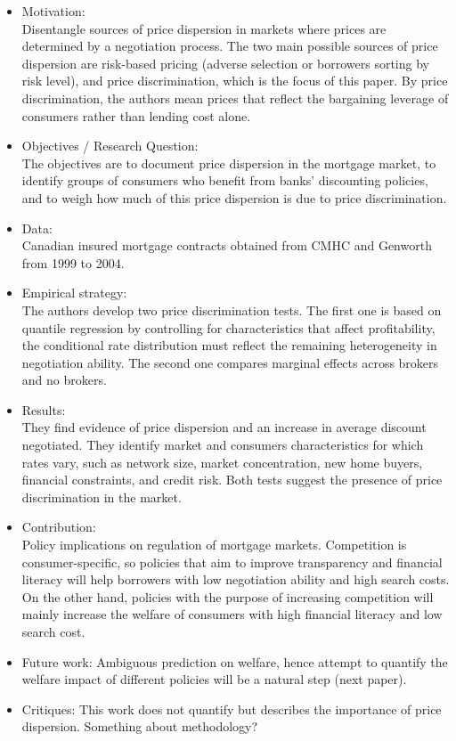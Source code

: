 \documentclass{article}
\theoremstyle{definition}
\begin{document}
\begin{itemize}
    \item Motivation: \\Disentangle sources of price dispersion in markets where prices are determined by a negotiation process. The two main possible sources of price dispersion are risk-based pricing (adverse selection or borrowers sorting by risk level), and price discrimination, which is the focus of this paper. By price discrimination, the authors mean prices that reflect the bargaining leverage of consumers rather than lending cost alone. 
    
    \item Objectives / Research Question:\\ The objectives are to document price dispersion in the mortgage market, to identify groups of consumers who benefit from banks' discounting policies, and to weigh how much of this price dispersion is due to price discrimination. 
    
    \item Data: \\Canadian insured mortgage contracts obtained from CMHC and Genworth from 1999 to 2004. 
    
    \item Empirical strategy: \\     The authors develop two price discrimination tests. The first one is based on quantile regression by controlling for characteristics that affect profitability, the conditional rate distribution must reflect the remaining heterogeneity in negotiation ability. The second one compares marginal effects across brokers and no brokers. 
    
    \item Results: \\They find evidence of price dispersion and an increase in average discount negotiated.  They identify market and consumers characteristics for which rates vary, such as network size, market concentration, new home buyers, financial constraints, and credit risk.  Both tests suggest the presence of price discrimination in the market. 
    
    \item Contribution: \\Policy implications on regulation of mortgage markets. Competition is consumer-specific, so policies that aim to improve transparency and financial literacy will help borrowers with low negotiation ability and high search costs. On the other hand, policies with the purpose of increasing competition will mainly increase the welfare of consumers with high financial literacy and low search cost.   
    \item Future work: Ambiguous prediction on welfare, hence attempt to quantify the welfare impact of different policies will be a natural step (next paper). 
    \item Critiques: This work does not quantify but describes the importance of price dispersion. Something about methodology?
\end{itemize}
\end{document}

